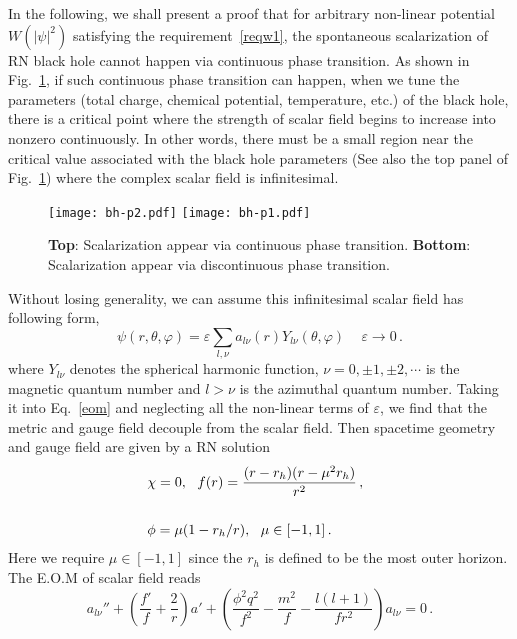 \documentclass[pr, twocolumn, preprintnumbers, showpacs,footnoteadded, superscriptaddress,nofootinbib,longbibliography]{revtex4-1}
\begin{document}
In the following, we shall present a proof that for arbitrary non-linear potential $W(|\psi|^2)$ satisfying the requirement~\eqref{reqw1}, the spontaneous scalarization of RN black hole cannot happen via continuous phase transition. As shown in Fig.~\ref{conscal}, if such continuous phase transition can happen, when we tune the parameters (total charge, chemical potential, temperature, etc.) of the black hole, there is a critical point where the strength of scalar field begins to increase into nonzero continuously. In other words, there must be a small region near the critical value associated with the black hole parameters (See also the top panel of Fig.~\ref{conscal}) where the complex scalar field is infinitesimal.
%
\begin{figure}[htpb]
  \centering
  \texttt{[image: bh-p2.pdf]}
  \texttt{[image: bh-p1.pdf]}
 \caption{\textbf{Top}: Scalarization appear via continuous phase transition. \textbf{Bottom}: Scalarization appear via discontinuous phase transition.}\label{conscal}
\end{figure}
%
Without losing generality, we can assume this infinitesimal scalar field has following form,
%
\begin{equation}
\psi(r, \theta, \varphi)=\varepsilon \sum_{l,\nu} a_{l \nu} (r) Y_{l \nu} (\theta, \varphi)\, \quad \varepsilon\rightarrow0\, .
\end{equation}
%
where $Y_{l \nu}$ denotes the spherical harmonic function, $\nu=0, \pm 1, \pm 2, \cdots$ is the magnetic quantum number and $l > \nu$ is the azimuthal quantum number.
Taking it into Eq.~\eqref{eom} and neglecting all the non-linear terms of $\varepsilon$, we find that the  metric and gauge field  decouple from the scalar field. Then spacetime geometry and gauge field are given by a RN solution
%
\begin{eqnarray}\label{rnsolu1}
  &\chi=0,~~f(r)=\frac{(r-r_h)(r-\mu^2r_h)}{r^2} \, , \cr
  ~\cr
  &\phi=\mu(1-r_h/r),~~\mu\in[-1,1]\,.
\end{eqnarray}
%
Here we require $\mu\in[-1,1]$ since the $r_h$ is defined to be the most outer horizon. The E.O.M of scalar field reads
%
\begin{equation}\label{eqscalar2}
  a_{l\nu}''+\left(\frac{f'}{f}+\frac2r\right)a'+\left(\frac{\phi^2q^2}{f^2}-\frac{m^2}{f}-\frac{l(l+1)}{f r^2}\right)a_{l\nu}=0 \, .
\end{equation}
\end{document}
